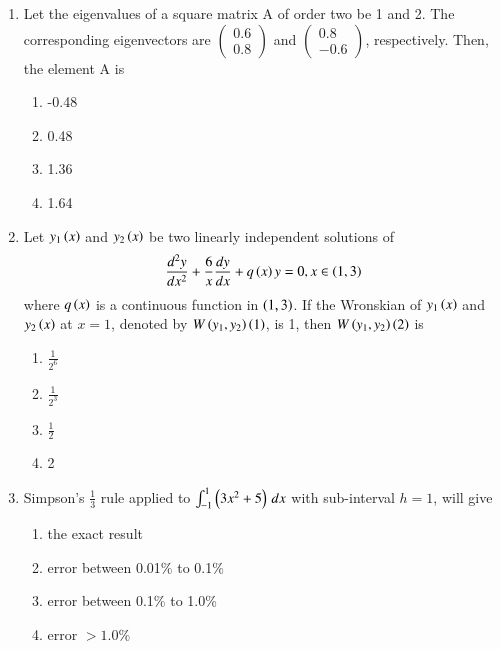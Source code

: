 \documentclass[journal,9pt,onecolumn]{IEEEtran}
\begin{document}
\begin{enumerate}
\item Let the eigenvalues of a square matrix A of order two be 1 and 2. The corresponding eigenvectors are $\begin{pmatrix}0.6\\ 0.8 \end{pmatrix}$ and $\begin{pmatrix}0.8\\ -0.6\end{pmatrix}$, respectively. Then, the element A is
\begin{multicols}{4}
\begin{enumerate}
    \item -0.48
    \item 0.48
    \item 1.36
    \item 1.64
\end{enumerate}
\end{multicols}


\item  Let $y_1\left(x\right)$ and $y_2\left(x\right)$ be two linearly independent solutions of $$\frac{d^2y}{dx^2} + \frac{6}{x} \frac{dy}{dx} + q\left(x\right)y = 0,  x \in \left(1,3\right)$$ where $q\left(x\right)$ is a continuous function in $\left(1,3\right)$. If the Wronskian of $y_1\left(x\right)$ and $y_2\left(x\right)$ at $x = 1$, denoted by $W\left(y_1,y_2\right)\left(1\right)$, is 1, then $W\left(y_1,y_2\right)\left(2\right)$ is
\begin{multicols}{4}    
\begin{enumerate}
    \item $\frac{1}{2^6}$
    \item $\frac{1}{2^3}$
    \item $\frac{1}{2}$
    \item 2
\end{enumerate}
\end{multicols}

\item    Simpson's $\frac{1}{3}$ rule applied to $\int_{-1}^{1} \left(3x^2 + 5\right) \, dx$ with sub-interval $h = 1$, will give
\begin{multicols}{2}    
\begin{enumerate}
    \item  the exact result
    \item  error between 0.01\% to 0.1\%
    \item  error between 0.1\% to 1.0\%
    \item  error $> 1.0\%$
\end{enumerate}
\end{multicols}



\end{enumerate}
\end{document}
